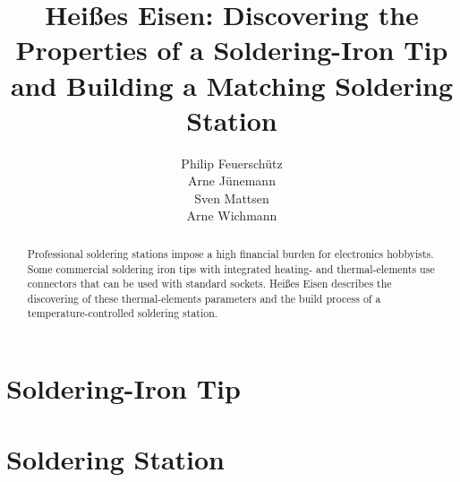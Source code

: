 \documentclass[a4paper]{IEEEconf}
\title{Heißes Eisen: Discovering the Properties of a Soldering-Iron Tip
and Building a Matching Soldering Station}
\author{%
	Philip Feuerschütz\\
	Arne Jünemann\\
	Sven Mattsen\\
	Arne Wichmann\\
}
\begin{document}
 
\maketitle{}
\begin{abstract}
Professional soldering stations impose a high financial burden for
electronics hobbyists. Some commercial soldering iron tips with integrated
heating- and thermal-elements use connectors that can be used with
standard sockets. Heißes Eisen describes the discovering of these
thermal-elements parameters and the build process of a
temperature-controlled soldering station.
\end{abstract}

\part{Soldering-Iron Tip}

\part{Soldering Station}


\end{document}
